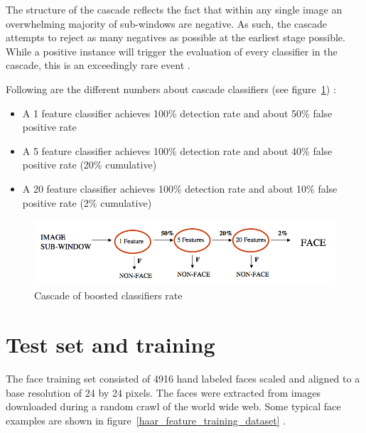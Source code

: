 \noindent The structure of the cascade reflects the fact that within any single image an overwhelming majority of sub-windows are negative. As such, the cascade attempts to reject as many negatives as possible at the earliest stage possible. While a positive instance will trigger the evaluation of every classifier in the cascade, this is an exceedingly rare event \cite{VIO01}.
\newline

\noindent Following are the different numbers about cascade classifiers (see figure~\ref{haar_feature_cascade_rate}) \cite{UBC01}:

\begin{itemize}
  \item A 1 feature classifier achieves 100\% detection rate and about 50\% false positive rate
  \item A 5 feature classifier achieves 100\% detection rate and about 40\% false positive rate (20\% cumulative)
  \item A 20 feature classifier achieves 100\% detection rate and about 10\% false positive rate (2\% cumulative)
\end{itemize}

\begin{figure}[!h]
\begin{center}
\noindent \includegraphics[scale=0.5]{figures/haar_feature_cascade_rate} 
\newline
\caption{Cascade of boosted classifiers rate}
\label{haar_feature_cascade_rate}
\end{center} 
\end{figure}

\section{Test set and training}

\vspace{\baselineskip}
\noindent The face training set consisted of 4916 hand labeled faces scaled and aligned to a base resolution of 24 by 24 pixels. The faces were extracted from images downloaded during a random crawl of the world wide web. Some typical face examples are shown in figure~\ref{haar_feature_training_dataset} \cite{VIO01}.
\newline

